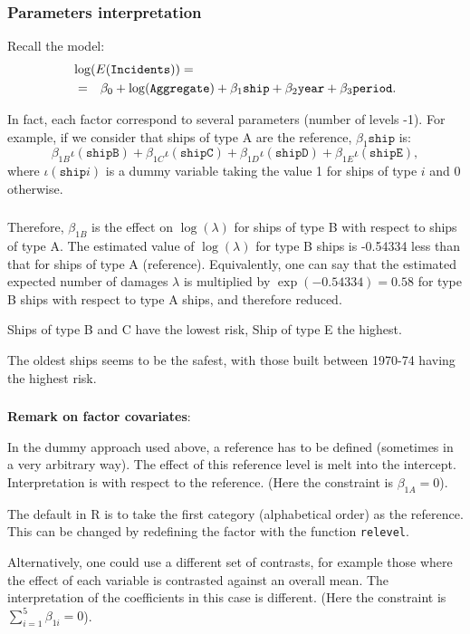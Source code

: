 \documentclass{beamer}
\newcommand{\bs}{\bigskip}
\begin{document}
\begin{frame}
\frametitle{Parameters interpretation}

Recall the model:
\begin{eqnarray*}
\lefteqn{\log(E(\texttt{Incidents})) = \hspace*{4cm}}\\
& = & \beta_0 + \log(\texttt{Aggregate}) + \beta_1 \texttt{ship} + \beta_2
\texttt{year}  + \beta_3 \texttt{period}.
\end{eqnarray*}

\bs
In fact, each factor correspond to several parameters (number of
levels -1). For example, if we consider that ships of type A are the
reference, $\beta_1 \texttt{ship}$ is:
$$ \beta_{1B} \iota(\texttt{shipB}) +\beta_{1C} \iota(\texttt{shipC})
+ \beta_{1D} \iota(\texttt{shipD}) + \beta_{1E} \iota(\texttt{shipE}),$$
where $\iota(\texttt{ship}i)$ is a dummy variable taking the value
1 for ships of type $i$ and 0 otherwise.
\end{frame}

\begin{frame}
\frametitle{}
Therefore, $\beta_{1B}$ is the effect on $\log(\lambda)$ for ships of
type B with respect to ships of type A. The estimated value of
$\log(\lambda)$ for type B ships is -0.54334 less than that for ships
of type A (reference).  Equivalently, one can say that the
estimated expected number of damages $\lambda$ is multiplied by
$\exp(-0.54334)=0.58$ for type B ships with respect to type A ships,
and therefore reduced.

\bs
Ships of type B and C have the lowest risk, Ship of type E the
highest.

\bs
The oldest ships seems to be the safest, with those built between
1970-74 having the highest risk.
\end{frame}

\begin{frame}
\frametitle{}
\textbf{Remark on factor covariates}:

In the dummy approach used
above, a reference has to be defined (sometimes in a very arbitrary
way). The effect of this reference level is melt into the
intercept. Interpretation is with respect to the reference. (Here the
constraint is $\beta_{1A}=0$).

The default in R is to take the first category (alphabetical order) as the
reference. This can be changed by redefining the factor with the function
\texttt{relevel}.

\bs
Alternatively, one could use a different set of
{\color{blue}contrasts}, for example those where the effect of each
variable is contrasted against an overall mean. The interpretation of
the coefficients in this case is different. (Here the constraint is
$\sum_{i=1}^5 \beta_{1i}=0$).
\end{frame}
\end{document}
